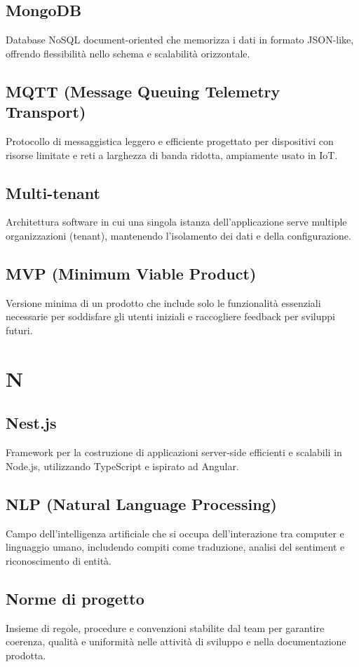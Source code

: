 \documentclass[a4paper,11pt]{article}
\begin{document}
\subsection{MongoDB}
Database NoSQL document-oriented che memorizza i dati in formato JSON-like, offrendo flessibilità nello schema e scalabilità orizzontale.

\subsection{MQTT (Message Queuing Telemetry Transport)}
Protocollo di messaggistica leggero e efficiente progettato per dispositivi con risorse limitate e reti a larghezza di banda ridotta, ampiamente usato in IoT.

\subsection{Multi-tenant}
Architettura software in cui una singola istanza dell'applicazione serve multiple organizzazioni (tenant), mantenendo l'isolamento dei dati e della configurazione.

\subsection{MVP (Minimum Viable Product)}
Versione minima di un prodotto che include solo le funzionalità essenziali necessarie per soddisfare gli utenti iniziali e raccogliere feedback per sviluppi futuri.

\newpage
\section{N}

\subsection{Nest.js}
Framework per la costruzione di applicazioni server-side efficienti e scalabili in Node.js, utilizzando TypeScript e ispirato ad Angular.

\subsection{NLP (Natural Language Processing)}
Campo dell'intelligenza artificiale che si occupa dell'interazione tra computer e linguaggio umano, includendo compiti come traduzione, analisi del sentiment e riconoscimento di entità.

\subsection{Norme di progetto}
Insieme di regole, procedure e convenzioni stabilite dal team per garantire coerenza, qualità e uniformità nelle attività di sviluppo e nella documentazione prodotta.
\end{document}
